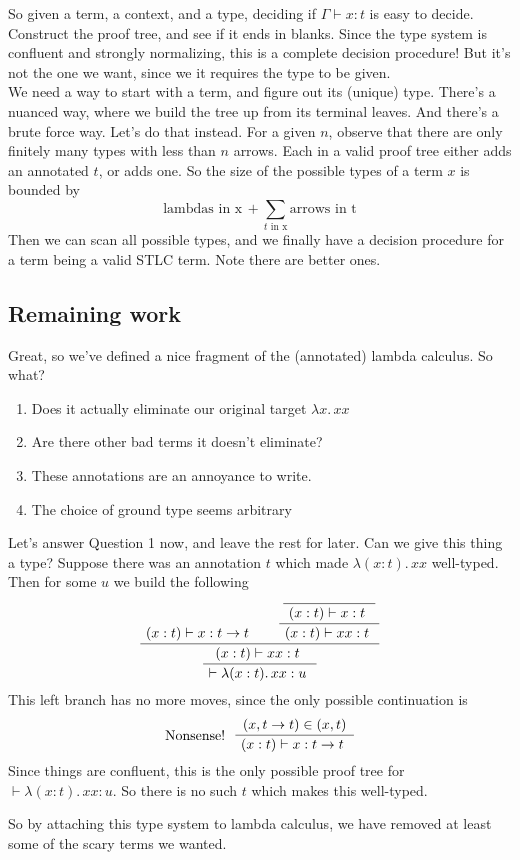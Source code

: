 \documentclass[12pt]{article}
\newenvironment{bprooftree}
  {\leavevmode\hbox\bgroup}
  {\DisplayProof\egroup}
\begin{document}
So given a term, a context, and a type, deciding if $\Gamma \vdash x : t$ is easy to decide.
Construct the proof tree, and see if it ends in blanks.
Since the type system is confluent and strongly normalizing, this is a complete decision procedure!
But it's not the one we want, since we it requires the type to be given.
\\\newline
We need a way to start with a term, and figure out its (unique) type.
There's a nuanced way, where we build the tree up from its terminal leaves.
And there's a brute force way. Let's do that instead.
For a given $n$, observe that there are only finitely many types with less than $n$ arrows.
Each in a valid proof tree either adds an annotated $t$, or adds one.
So the size of the possible types of a term $x$ is bounded by 
\[
  \text{lambdas in x} \, + \sum_{t \text{ in x}} \text{arrows in t}
\]
Then we can scan all possible types, and we finally have a decision procedure for a term being a valid STLC term.
Note there are better ones.

\subsection{Remaining work}
Great, so we've defined a nice fragment of the (annotated) lambda calculus.
So what?
\begin{enumerate}
    \item Does it actually eliminate our original target $\lambda x.\,xx$
    \item Are there other bad terms it doesn't eliminate?
    \item These annotations are an annoyance to write.
    \item The choice of ground type seems arbitrary
\end{enumerate}

\noindent Let's answer Question 1 now, and leave the rest for later.
Can we give this thing a type? Suppose there was an annotation $t$ which made $\lambda (x:t).\,xx$ well-typed.
Then for some $u$ we build the following
\[
\begin{bprooftree}
\AxiomC{$ (x:t) \vdash x : t \rightarrow t$ }
  \AxiomC{}
  \UnaryInfC{$ (x:t) \vdash x : t$ }
  \UnaryInfC{$ (x:t) \vdash xx : t$ }
\BinaryInfC{$ (x:t) \vdash xx : t$ }
\UnaryInfC{$ \vdash \lambda (x:t).\,xx : u$ }
\end{bprooftree}
\]
This left branch has no more moves, since the only possible continuation is
\[
\begin{bprooftree}
\AxiomC{$ (x,t \rightarrow t) \in (x,t)$}
\LeftLabel{Nonsense!  }
\UnaryInfC{$ (x:t) \vdash x : t \rightarrow t$ }
\end{bprooftree}
\]
Since things are confluent, this is the only possible proof tree for $\vdash \lambda (x:t).\,xx : u$.
So there is no such $t$ which makes this well-typed.

So by attaching this type system to lambda calculus, we have removed at least some of the scary terms we wanted.
\end{document}
